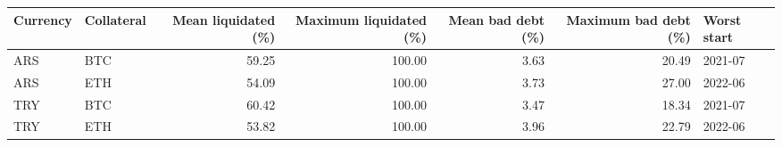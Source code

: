 \begin{tabular}{llrrrrl}
\toprule
Currency & Collateral & Mean liquidated (\%) & Maximum liquidated (\%) & Mean bad debt (\%) & Maximum bad debt (\%) & Worst start \\
\midrule
ARS & BTC & 59.25 & 100.00 & 3.63 & 20.49 & 2021-07 \\
ARS & ETH & 54.09 & 100.00 & 3.73 & 27.00 & 2022-06 \\
TRY & BTC & 60.42 & 100.00 & 3.47 & 18.34 & 2021-07 \\
TRY & ETH & 53.82 & 100.00 & 3.96 & 22.79 & 2022-06 \\
\bottomrule
\end{tabular}
